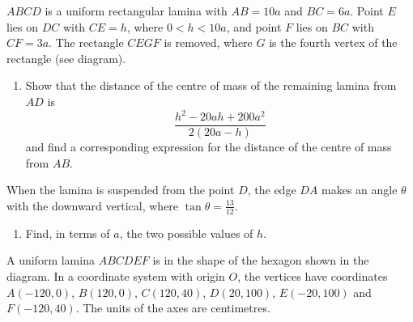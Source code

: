 \documentclass[leqno]{article}
\begin{document}
\begin{enumerate}[
  label=\textbf{\arabic*.},
  leftmargin=*,
  topsep=0pt,
  partopsep=0pt,
  parsep=0pt
]
$ABCD$ is a uniform rectangular lamina with $AB=10a$ and $BC=6a$. Point $E$ lies on $DC$ with $CE=h$, where $0<h<10a$, and point $F$ lies on $BC$ with $CF=3a$. The rectangle $CEGF$ is removed, where $G$ is the fourth vertex of the rectangle (see diagram). \\
\begin{enumerate}[label=\textbf{(\alph*)}]
  \item Show that the distance of the centre of mass of the remaining lamina from $AD$ is
  \[
  \dfrac{h^2-20ah+200a^2}{2(20a-h)}
  \]
  and find a corresponding expression for the distance of the centre of mass from $AB$.  \\
\end{enumerate}
When the lamina is suspended from the point $D$, the edge $DA$ makes an angle $\theta$ with the downward vertical, where $\tan\theta=\frac{13}{12}$. \\
\begin{enumerate}[label=\textbf{(\alph*)}, resume]
  \item Find, in terms of $a$, the two possible values of $h$.  \\
\end{enumerate}

\newpage

\questionitem

\begin{figure}[H]
    \centering
{}
\end{figure}


A uniform lamina $ABCDEF$ is in the shape of the hexagon shown in the diagram. In a coordinate system with origin $O$, the vertices have coordinates $A(-120,0)$, $B(120,0)$, $C(120,40)$, $D(20,100)$, $E(-20,100)$ and $F(-120,40)$. The units of the axes are centimetres. \\


\end{enumerate}
\end{document}
